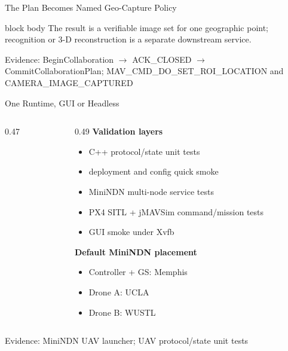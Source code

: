 \documentclass[aspectratio=169]{beamer}
\newcommand{\bluebox}[1]{%
  \begin{beamercolorbox}[rounded=true,shadow=false,sep=0.65em,wd=0.94\linewidth]{block body}
  #1
  \end{beamercolorbox}
}
\newcommand{\evidence}[1]{%
  \vfill\par\noindent
  \begin{minipage}{\linewidth}
  \raggedright{\color{SoftGray}\tiny Evidence: #1}\par
  \end{minipage}
}
\begin{document}
\begin{frame}{The Plan Becomes Named Geo-Capture Policy}
\bluebox{The result is a verifiable image set for one geographic point; recognition or 3-D reconstruction is a separate downstream service.}
\evidence{BeginCollaboration $\rightarrow$ ACK\_CLOSED $\rightarrow$ CommitCollaborationPlan; MAV\_CMD\_DO\_SET\_ROI\_LOCATION and CAMERA\_IMAGE\_CAPTURED}
\end{frame}

\begin{frame}{One Runtime, GUI or Headless}
\footnotesize
\begin{columns}[T]
\begin{column}{0.47\textwidth}
\begin{center}
\end{center}
\end{column}
\begin{column}{0.49\textwidth}
\textbf{Validation layers}
\begin{itemize}
  \item C++ protocol/state unit tests
  \item deployment and config quick smoke
  \item MiniNDN multi-node service tests
  \item PX4 SITL + jMAVSim command/mission tests
  \item GUI smoke under Xvfb
\end{itemize}

\textbf{Default MiniNDN placement}
\begin{itemize}
  \item Controller + GS: Memphis
  \item Drone A: UCLA
  \item Drone B: WUSTL
\end{itemize}
\end{column}
\end{columns}
\evidence{MiniNDN UAV launcher; UAV protocol/state unit tests}
\end{frame}
\end{document}

